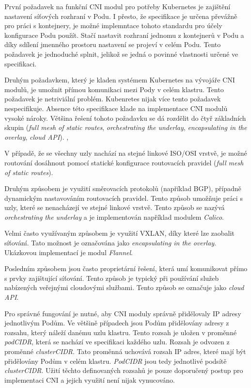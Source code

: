 \bigskip

První požadavek na funkční CNI modul pro potřeby Kubernetes je zajištění nastavení síťových rozhraní v Podu. I přesto, že specifikace je určena převážně pro práci s kontejnery, je možné implemntace tohoto standardu pro účely konfigurace Podu použít. Stačí nastavit rozhraní jednomu z kontejnerů v Podu a díky sdílení jmenného prostoru nastavení se projeví v celém Podu. Tento požadavek je jednoduché splnit, jelikož se jedná o povinné vlastnosti určené ve specifikaci.

\bigskip

Druhým požadavkem, který je kladen systémem Kubernetes na vývojáře CNI modulů, je umožnit přímou komunikaci mezi Pody v celém klastru. Tento požadavek je netriviální problém. Kubenretes nijak více tento požadavek nespecifikuje. Absence této specifikace klade na implementace CNI modulů vysoké nároky. Většina řešení tohoto požadavku se dá rozdělit do čtyř základních skupin (\textit{full mesh of static routes}, \textit{orchestrating the underlay}, \textit{encapsulating in the overlay}, \textit{cloud API}). \cite{kashin_2022_cni}, \cite{cncfcloudnativecomputingfoundation_2019_kubernetes}

V případě, že se všechny uzly nachází na stejné linkové ISO/OSI vrstvě, je možné routování dosáhnout pomocí statické konfigurace routovacích pravidel (\textit{full mesh of static routes}).

Druhým způsobem je využití směrovacích protokolů (například BGP), případně dynamickým nastavováním routovacích pravidel. Tento způsob umožňuje práci s uzly, které se nenacházejí ve stejné linkové vrstvě. Tento způsob se nazývá \textit{orchestrating the underlay} a je implementován například modulem \textit{Calico}.

Velmi často využívaným způsobem je využití VXLAN, díky které lze zaobalit síťování. Tato možnost je označována jako \textit{encapsulating in the overlay}. Ukázkovou implementací je modul \textit{Flannel}.

Posledním způsobem jsou často proprietární řešení, která umí komunikovat přímo s prvky zajištující síťování. Tento způsob je typický při používání služeb nabízených veřejnými cloudovými službami. Tento způsob se označuje jako \textit{cloud API}.

\bigskip

Pro správné fungování je nutné, aby CNI moduly správně přidělovaly IP adresy jednotlivým Podům. Ve většině případech jsou Podům přidělovány adresy z rozsahu, který náleží danému uzlu klastru. Tento rozsah je uložen v proměnné \textit{podCIDR}, která se nachází ve specifikaci každého uzlu. Rozsah je odvozen z proměnné \textit{clusterCIDR}. Tato proměnná uchovává rozsah IP adres, které mají být přidělovány Podům v celém klastru. \textit{PodCIDR} jsou tedy jednotlivé podsítě \textit{clusterCIDR}. Užití těchto definovaných rozsahů je pouze doporučený postup pro implementaci CNI a jejich využití není nijak vynucováno. \cite{cncfcloudnativecomputingfoundation_2019_kubernetes}       

